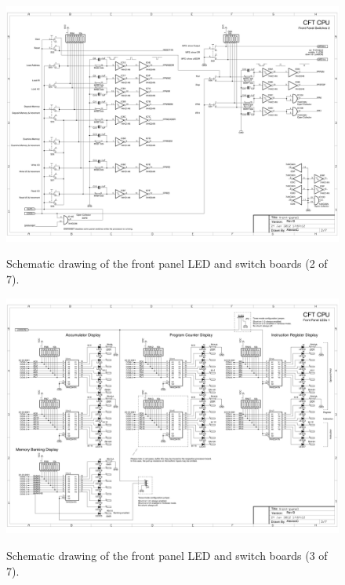\documentclass[11pt,a4paper,twocolumns]{article}
\begin{document}
\begin{figure}
\centering
\includegraphics[width=0.95\textheight,angle=90]{figs/front-panel-2.jpg}\\
\caption{\label{fig-schematic-front-panel-2}Schematic drawing of the front panel LED and switch boards (2 of 7).}
\end{figure}

\begin{figure}
\centering
\includegraphics[width=0.95\textheight,angle=90]{figs/front-panel-3.jpg}\\
\caption{\label{fig-schematic-front-panel-3}Schematic drawing of the front panel LED and switch boards (3 of 7).}
\end{figure}
\end{document}
